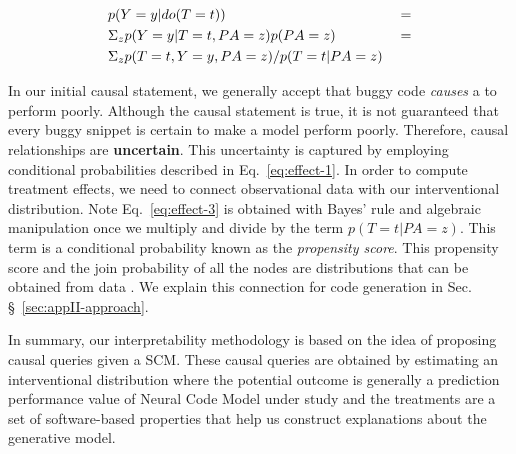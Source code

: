 \begin{subequations}
    {%
        \begin{align}
        &p(Y=y|do(T=t)) &&=  \label{eq:effect-1}\\
        &\Sigma_z p(Y=y|T=t,PA=z)p(PA=z)  &&= \label{eq:effect-2}\\
        &\Sigma_z p(T=t,Y=y,PA=z)/p(T=t|PA=z) \label{eq:effect-3}
        \end{align}
    }
\label{eq:effect}
\end{subequations}

In our initial causal statement, we generally accept that buggy code \textit{causes} a \nlm to perform poorly. Although the causal statement is true, it is not guaranteed that every buggy snippet is certain to make a model perform poorly. Therefore, causal relationships are \textbf{uncertain}. This uncertainty is captured by employing conditional probabilities described in Eq.~\ref{eq:effect-1}. In order to compute treatment effects, we need to connect observational data with our interventional distribution. Note Eq.~\ref{eq:effect-3} is obtained with Bayes' rule and algebraic manipulation once we multiply and divide by the term $p(T=t|PA=z)$. This term is a conditional probability known as the \textit{propensity score}. This propensity score and the join probability of all the nodes are distributions that can be obtained from data \citep{Pearl2016Causality}. We explain this connection for code generation in Sec. \S~\ref{sec:appII-approach}. 

In summary, our interpretability methodology \codegen is based on the idea of proposing causal queries given a SCM. These causal queries are obtained by estimating an interventional distribution where the potential outcome is generally a prediction performance value of Neural Code Model under study and the treatments are a set of software-based properties that help us construct explanations about the generative model.